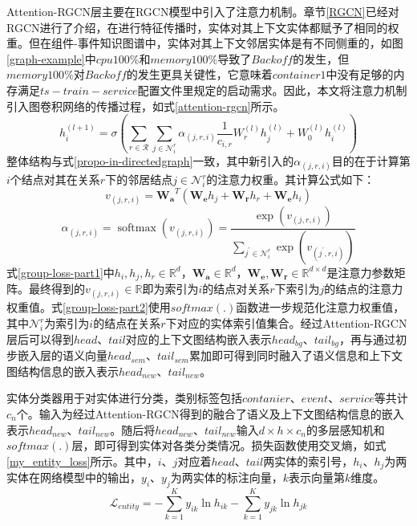 Attention-RGCN层主要在RGCN模型中引入了注意力机制。章节\ref{RGCN}已经对RGCN进行了介绍，在进行特征传播时，实体对其上下文实体都赋予了相同的权重。但在组件-事件知识图谱中，实体对其上下文邻居实体是有不同侧重的，如图\ref{graph-example}中$cpu 100\%$和$memory 100\%$导致了$Backoff$的发生，但$memory 100\%$对$Backoff$的发生更具关键性，它意味着$container1$中没有足够的内存满足$ts-train-service$配置文件里规定的启动需求。因此，本文将注意力机制引入图卷积网络的传播过程，如式\ref{attention-rgcn}所示。
\begin{equation}
    h_{i}^{(l+1)}=\sigma\left(\sum_{r \in \mathcal{R}} \sum_{j \in \mathcal{N}_{i}^{r}} \alpha_{(j, r, i)} \frac{1}{c_{i, r}} W_{r}^{(l)} h_{j}^{(l)}+W_{0}^{(l)} h_{i}^{(l)}\right)
    \label{attention-rgcn}
\end{equation}
整体结构与式\ref{propo-in-directedgraph}一致，其中新引入的$\alpha_{(j, r, i)}$目的在于计算第$i$个结点对其在关系$r$下的邻居结点$j \in \mathcal{N}_{i}^{r}$的注意力权重。其计算公式如下：
\begin{equation}
    v_{(j, r, i)}=\mathbf{W_a}^{T}\left(\mathbf{W_e} h_{j}+\mathbf{W_r} h_{r} + \mathbf{W_e} h_{i}\right)
    \label{group-loss-part1}
\end{equation}
\begin{equation}
    \alpha_{(j, r, i)}=\operatorname{softmax}\left(v_{(j, r, i)}\right)=\frac{\exp \left(v_{(j, r, i)}\right)}{\sum_{j^{\prime} \in \mathcal{N}_{i}^{r}} \exp \left(v_{\left(j^{\prime}, r, i\right)}\right)}
    \label{group-loss-part2}
\end{equation}
式\ref{group-loss-part1}中$h_i,h_j,h_r\in\mathbb{R}^{d}$，$\mathbf{W_a}\in \mathbb{R}^{d}$，$\mathbf{W_e},\mathbf{W_r} \in \mathbb{R}^{d\times d}$是注意力参数矩阵。最终得到的$ v_{(j, r, i)} \in \mathbb{R}$即为索引为$i$的结点对关系$r$下索引为$j$的结点的注意力权重值。式\ref{group-loss-part2}使用$softmax(.)$函数进一步规范化注意力权重值，其中$\mathcal{N}_{i}^{r}$为索引为$i$的结点在关系$r$下对应的实体索引值集合。经过Attention-RGCN层后可以得到$head$、$tail$对应的上下文图结构嵌入表示$head_{bg}$、$tail_{bg}$，再与通过初步嵌入层的语义向量$head_{sem}$、$tail_{sem}$累加即可得到同时融入了语义信息和上下文图结构信息的嵌入表示$head_{new}$、$tail_{new}$。

实体分类器用于对实体进行分类，类别标签包括$contanier$、$event$、$service$等共计$c_{n}$个。输入为经过Attention-RGCN得到的融合了语义及上下文图结构信息的嵌入表示$head_{new}$、$tail_{new}$。随后将$head_{new}$、$tail_{new}$输入$d \times h \times c_{n}$的多层感知机和$softmax(.)$层，即可得到实体对各类分类情况。损失函数使用交叉熵，如式\ref{my_entity_loss}所示。其中，$i$、$j$对应着$head$、$tail$两实体的索引号，$h_i$、$h_j$为两实体在网络模型中的输出，$y_i$、$y_j$为两实体的标注向量，$k$表示向量第$k$维度。
\begin{equation}
    \mathcal{L}_{entity}= - \sum_{k=1}^{K} y_{i k} \ln h_{i k} - \sum_{k=1}^{K} y_{j k} \ln h_{j k}
    \label{my_entity_loss}
\end{equation}

